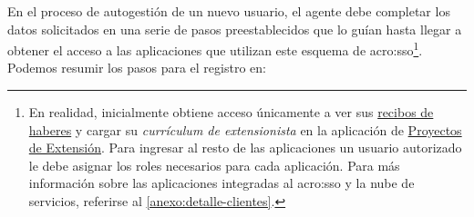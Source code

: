 En el proceso de autogestión de un nuevo usuario, el agente debe completar los datos solicitados en una serie de pasos preestablecidos que lo guían hasta llegar a obtener el acceso a las aplicaciones que utilizan este esquema de \gls{acro:sso}\footnote{En realidad, inicialmente obtiene acceso únicamente a ver sus \hyperref[anexo:detalle-clientes:recibos]{recibos de haberes} y cargar su \textit{currículum de extensionista} en la aplicación de \hyperref[anexo:detalle-clientes:extension]{Proyectos de Extensión}. Para ingresar al resto de las aplicaciones un usuario autorizado le debe asignar los roles necesarios para cada aplicación. Para más información sobre las aplicaciones integradas al \gls{acro:sso} y la nube de servicios, referirse al \autoref{anexo:detalle-clientes}.}. Podemos resumir los pasos para el registro en:

